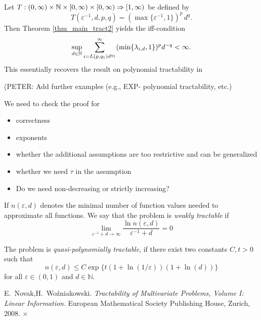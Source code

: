\documentclass[11pt,a4paper]{article}
\newcommand{\fred}[1]{\begingroup\color{blue}#1\endgroup}
\newcommand{\peter}[1]{\begingroup\color{purple}#1\endgroup}
\begin{document}
Let $T: (0,\infty) \times \mathbb{N} \times [0,\infty) \times [0,\infty)\Rightarrow [1,\infty)$
be defined by
\[
 T(\varepsilon^{-1},d,p,q)= (\max\{\varepsilon^{-1},1\})^p\, d^q.
\]
Then Theorem \ref{thm_main_tract2} yields the iff-condition
\[
 \sup_{d\in\mathbb{N}} \sum_{i=L(p,q_1) d^{q_1}}^\infty (\min\{\lambda_{i,d},1\})^p d^{-q} < \infty.
\]
This essentially recovers the result on polynomial tractability in \cite[Theorem 5.1]{NW08}



\peter{(PETER: Add further examples (e.g., EXP- polynomial tractability, etc.)}

\bigskip

\fred{We need to check the proof for
\begin{itemize}
\item correctness
\item exponents
\item whether the additional assumptions are too restrictive and can be generalized
\item whether we need $\tau$ in the assumption
\item Do we need non-decreasing or strictly increasing?
\end{itemize}}
\begin{definition}
If $n(\varepsilon,d)$ denotes the minimal number of function values needed to approximate all functions. We say that the problem is \emph{weakly tractable} if
    \[\lim_{\varepsilon^{-1}+d\rightarrow \infty} \frac{\ln n(\varepsilon,d)}{\varepsilon^{-1}+d} = 0\]
\end{definition}
\begin{definition}
    The problem is \emph{quasi-polynomially tractable}, if there exist two constants $C, t> 0$ such that
    \[
    n(\varepsilon,d) \leq C\exp\{t(1+\ln(1/\varepsilon))(1+\ln(d))\}
    \] for all $\varepsilon \in (0,1)$ and $d\in\mathbb{N}$.
\end{definition}
\begin{thebibliography}{99}

 E.~Novak,H.~Wo\'zniakowski. \textit{Tractability of Multivariate Problems, Volume I: Linear Information}.
European Mathematical Society Publishing House, Zurich, 2008.
 ×
\end{thebibliography}
\end{document}
